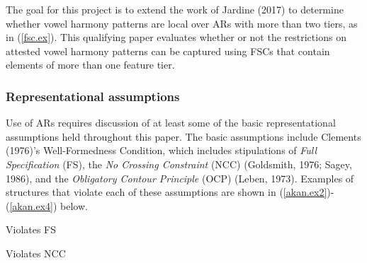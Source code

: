 \documentclass[,doc,floatsintext]{apa6}
\theoremstyle{definition}
\theoremstyle{definition}
\theoremstyle{definition}
\theoremstyle{remark}
\begin{document}
The goal for this project is to extend the work of Jardine (2017) to
determine whether vowel harmony patterns are local over ARs with more
than two tiers, as in (\ref{fsc.ex}). This qualifying paper evaluates
whether or not the restrictions on attested vowel harmony patterns can
be captured using FSCs that contain elements of more than one feature
tier.

\subsubsection{Representational
assumptions}\label{representational-assumptions}

Use of ARs requires discussion of at least some of the basic
representational assumptions held throughout this paper. The basic
assumptions include Clements (1976)'s Well-Formedness Condition, which
includes stipulations of \emph{Full Specification} (FS), the \emph{No
Crossing Constraint} (NCC) (Goldsmith, 1976; Sagey, 1986), and the
\emph{Obligatory Contour Principle} (OCP) (Leben, 1973). Examples of
structures that violate each of these assumptions are shown in
(\ref{akan.ex2})-(\ref{akan.ex4}) below.

\begin{exe}
\ex \label{akan.ex2} Violates FS
\end{exe}

\begin{exe}
\ex \label{akan.ex3} Violates NCC
\end{exe}
\end{document}
